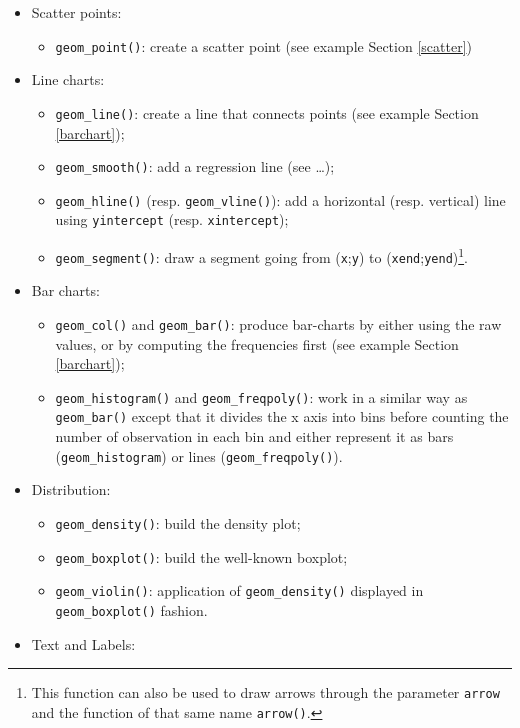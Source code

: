 \documentclass[
]{krantz}
\providecommand{\tightlist}{%
  \setlength{\itemsep}{0pt}\setlength{\parskip}{0pt}}
\begin{document}
\begin{itemize}
\tightlist
\item
  Scatter points:

  \begin{itemize}
  \tightlist
  \item
    \texttt{geom\_point()}: create a scatter point (see example Section \ref{scatter})
  \end{itemize}
\item
  Line charts:

  \begin{itemize}
  \tightlist
  \item
    \texttt{geom\_line()}: create a line that connects points (see example Section \ref{barchart});
  \item
    \texttt{geom\_smooth()}: add a regression line (see \ldots);
  \item
    \texttt{geom\_hline()} (resp. \texttt{geom\_vline()}): add a horizontal (resp. vertical) line using \texttt{yintercept} (resp. \texttt{xintercept});
  \item
    \texttt{geom\_segment()}: draw a segment going from (\texttt{x};\texttt{y}) to (\texttt{xend};\texttt{yend})\footnote{This function can also be used to draw arrows through the parameter \texttt{arrow} and the function of that same name \texttt{arrow()}.}.
  \end{itemize}
\item
  Bar charts:

  \begin{itemize}
  \tightlist
  \item
    \texttt{geom\_col()} and \texttt{geom\_bar()}: produce bar-charts by either using the raw values, or by computing the frequencies first (see example Section \ref{barchart});
  \item
    \texttt{geom\_histogram()} and \texttt{geom\_freqpoly()}: work in a similar way as \texttt{geom\_bar()} except that it divides the x axis into bins before counting the number of observation in each bin and either represent it as bars (\texttt{geom\_histogram}) or lines (\texttt{geom\_freqpoly()}).
  \end{itemize}
\item
  Distribution:

  \begin{itemize}
  \tightlist
  \item
    \texttt{geom\_density()}: build the density plot;
  \item
    \texttt{geom\_boxplot()}: build the well-known boxplot;
  \item
    \texttt{geom\_violin()}: application of \texttt{geom\_density()} displayed in \texttt{geom\_boxplot()} fashion.
  \end{itemize}
\item
  Text and Labels:


\end{itemize}
\end{document}
